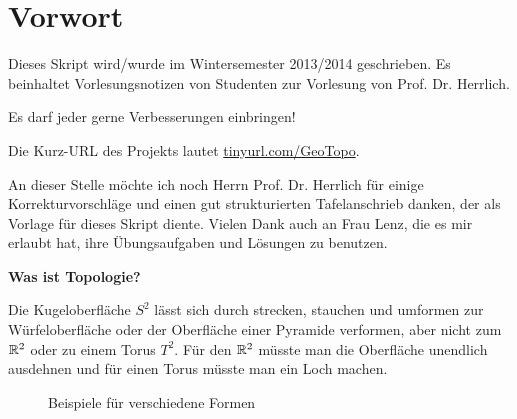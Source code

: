 \chapter*{Vorwort}
Dieses Skript wird/wurde im Wintersemester 2013/2014 geschrieben.
Es beinhaltet Vorlesungsnotizen von Studenten zur Vorlesung von
Prof. Dr. Herrlich.

Es darf jeder gerne Verbesserungen einbringen!

Die Kurz-URL des Projekts lautet \href{http://tinyurl.com/GeoTopo}{tinyurl.com/GeoTopo}.

An dieser Stelle möchte ich noch Herrn Prof. Dr. Herrlich 
für einige Korrekturvorschläge und einen gut strukturierten 
Tafelanschrieb danken, der als Vorlage für dieses Skript diente.
Vielen Dank auch an Frau Lenz, die es mir erlaubt hat, ihre 
Übungsaufgaben und Lösungen zu benutzen.


\textbf{Was ist Topologie?}

Die Kugeloberfläche $S^2$ lässt sich durch strecken, stauchen
und umformen zur Würfeloberfläche oder
der Oberfläche einer Pyramide verformen, aber nicht zum $\mdr^2$
oder zu einem Torus $T^2$. Für den $\mdr^2$ müsste man die Oberfläche
unendlich ausdehnen und für einen Torus müsste man ein Loch machen.

\begin{figure}[ht]
    \centering
    \subfigure[$S^2$]{
        
        \label{fig:s2}
    }%
    \subfigure[Würfel]{
        
        \label{fig:cube}
    }%
    \subfigure[Pyramide]{
        
        \label{fig:pyramide}
    }

    \subfigure[$\mdr^2$]{
        
        \label{fig:plane-r2}
    }%
    \label{Formen}
    \caption{Beispiele für verschiedene Formen}
\end{figure}
